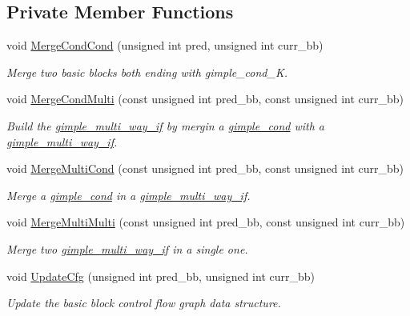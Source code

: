 \subsection*{Private Member Functions}
\begin{DoxyCompactItemize}
\item 
void \hyperlink{classmulti__way__if_ae7810fa463c0f83a9a3e3b274a832582}{Merge\+Cond\+Cond} (unsigned int pred, unsigned int curr\+\_\+bb)
\begin{DoxyCompactList}\small\item\em Merge two basic blocks both ending with gimple\+\_\+cond\+\_\+K. \end{DoxyCompactList}\item 
void \hyperlink{classmulti__way__if_ad207368bda4ed43c0b73088848d2521f}{Merge\+Cond\+Multi} (const unsigned int pred\+\_\+bb, const unsigned int curr\+\_\+bb)
\begin{DoxyCompactList}\small\item\em Build the \hyperlink{structgimple__multi__way__if}{gimple\+\_\+multi\+\_\+way\+\_\+if} by mergin a \hyperlink{structgimple__cond}{gimple\+\_\+cond} with a \hyperlink{structgimple__multi__way__if}{gimple\+\_\+multi\+\_\+way\+\_\+if}. \end{DoxyCompactList}\item 
void \hyperlink{classmulti__way__if_a61400a9cda1ead68203f4fa34ca2a120}{Merge\+Multi\+Cond} (const unsigned int pred\+\_\+bb, const unsigned int curr\+\_\+bb)
\begin{DoxyCompactList}\small\item\em Merge a \hyperlink{structgimple__cond}{gimple\+\_\+cond} in a \hyperlink{structgimple__multi__way__if}{gimple\+\_\+multi\+\_\+way\+\_\+if}. \end{DoxyCompactList}\item 
void \hyperlink{classmulti__way__if_a074fa69a22db0768c7e6b7f237ef38d7}{Merge\+Multi\+Multi} (const unsigned int pred\+\_\+bb, const unsigned int curr\+\_\+bb)
\begin{DoxyCompactList}\small\item\em Merge two \hyperlink{structgimple__multi__way__if}{gimple\+\_\+multi\+\_\+way\+\_\+if} in a single one. \end{DoxyCompactList}\item 
void \hyperlink{classmulti__way__if_acff7c7c7e90fbeabb45e4dec35ec9fa2}{Update\+Cfg} (unsigned int pred\+\_\+bb, unsigned int curr\+\_\+bb)
\begin{DoxyCompactList}\small\item\em Update the basic block control flow graph data structure. \end{DoxyCompactList}\item 

\end{DoxyCompactItemize}
